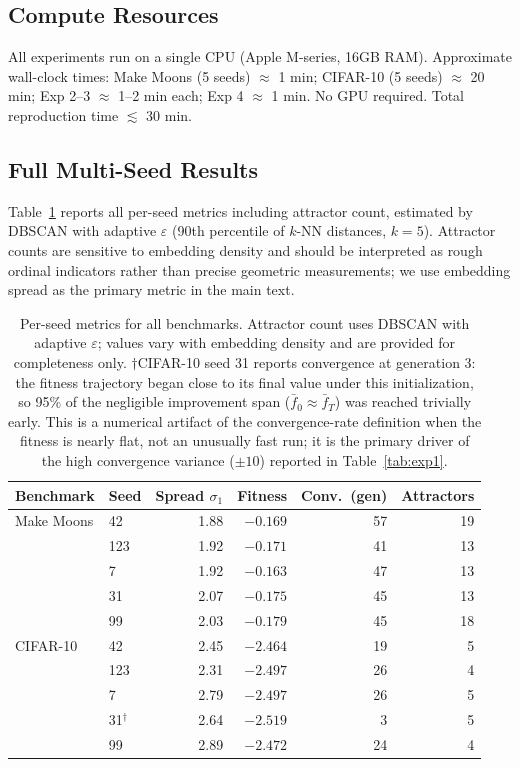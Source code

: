 \documentclass{article}
\begin{document}
\subsection{Compute Resources}

All experiments run on a single CPU (Apple M-series, 16GB RAM).
Approximate wall-clock times: Make Moons (5 seeds) $\approx$ 1 min;
CIFAR-10 (5 seeds) $\approx$ 20 min; Exp 2--3 $\approx$ 1--2 min each;
Exp 4 $\approx$ 1 min. No GPU required. Total reproduction time
$\lesssim$ 30 min.

\subsection{Full Multi-Seed Results}

Table~\ref{tab:exp1_full} reports all per-seed metrics including
attractor count, estimated by DBSCAN with adaptive $\varepsilon$
(90th percentile of $k$-NN distances, $k=5$). Attractor counts are
sensitive to embedding density and should be interpreted as rough
ordinal indicators rather than precise geometric measurements; we
use embedding spread as the primary metric in the main text.

\begin{table}[h]
  \caption{Per-seed metrics for all benchmarks. Attractor count uses
  DBSCAN with adaptive $\varepsilon$; values vary with embedding
  density and are provided for completeness only.
  $\dagger$CIFAR-10 seed 31 reports convergence at generation 3:
  the fitness trajectory began close to its final value under this
  initialization, so 95\% of the negligible improvement span
  ($\bar{f}_0 \approx \bar{f}_T$) was reached trivially early.
  This is a numerical artifact of the convergence-rate definition
  when the fitness is nearly flat, not an unusually fast run;
  it is the primary driver of the high convergence variance ($\pm 10$)
  reported in Table~\ref{tab:exp1}.}
  \label{tab:exp1_full}
  \centering
  \small
  \begin{tabular}{llrrrr}
    \toprule
    Benchmark & Seed & Spread $\sigma_1$ & Fitness & Conv.\ (gen) & Attractors \\
    \midrule
    Make Moons & 42  & 1.88 & $-0.169$ & 57 & 19 \\
               & 123 & 1.92 & $-0.171$ & 41 & 13 \\
               & 7   & 1.92 & $-0.163$ & 47 & 13 \\
               & 31  & 2.07 & $-0.175$ & 45 & 13 \\
               & 99  & 2.03 & $-0.179$ & 45 & 18 \\
    \midrule
    CIFAR-10   & 42  & 2.45 & $-2.464$ & 19 & 5 \\
               & 123 & 2.31 & $-2.497$ & 26 & 4 \\
               & 7   & 2.79 & $-2.497$ & 26 & 5 \\
               & 31$^\dagger$  & 2.64 & $-2.519$ &  3 & 5 \\
               & 99  & 2.89 & $-2.472$ & 24 & 4 \\
    \bottomrule
  \end{tabular}
\end{table}
\end{document}
